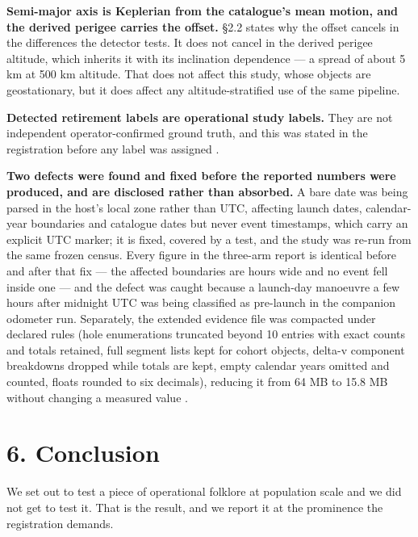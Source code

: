\documentclass[11pt]{article}
\begin{document}
\textbf{Semi-major axis is Keplerian from the catalogue's mean motion, and the derived perigee carries the offset.} \S{}2.2 states why the offset cancels in the differences the detector tests. It does not cancel in the derived perigee altitude, which inherits it with its inclination dependence --- a spread of about 5 km at 500 km altitude. That does not affect this study, whose objects are geostationary, but it does affect any altitude-stratified use of the same pipeline.

\textbf{Detected retirement labels are operational study labels.} They are not independent operator-confirmed ground truth, and this was stated in the registration before any label was assigned%
.

\textbf{Two defects were found and fixed before the reported numbers were produced, and are disclosed rather than absorbed.} A bare date was being parsed in the host's local zone rather than UTC, affecting launch dates, calendar-year boundaries and catalogue dates but never event timestamps, which carry an explicit UTC marker; it is fixed, covered by a test, and the study was re-run from the same frozen census. Every figure in the three-arm report is identical before and after that fix --- the affected boundaries are hours wide and no event fell inside one --- and the defect was caught because a launch-day manoeuvre a few hours after midnight UTC was being classified as pre-launch in the companion odometer run. Separately, the extended evidence file was compacted under declared rules (hole enumerations truncated beyond 10 entries with exact counts and totals retained, full segment lists kept for cohort objects, delta-v component breakdowns dropped while totals are kept, empty calendar years omitted and counted, floats rounded to six decimals), reducing it from 64 MB to 15.8 MB without changing a measured value%
.

\section*{6. Conclusion}

We set out to test a piece of operational folklore at population scale and we did not get to test it. That is the result, and we report it at the prominence the registration demands.
\end{document}
